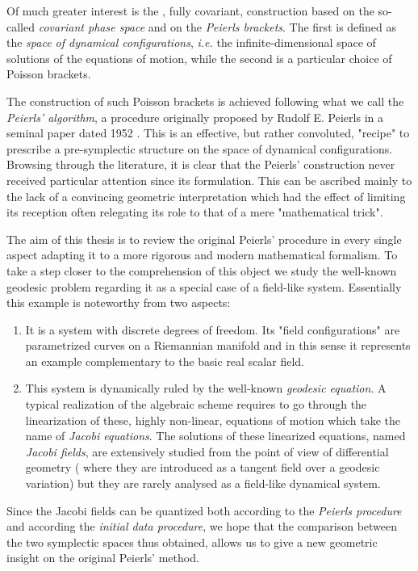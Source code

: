 \documentclass[Main]{subfiles}
\begin{document}
	
Of much greater interest is the , fully covariant, construction based on the so-called \emph{covariant phase space} and on the \emph{Peierls brackets}.
	The first is defined as the \emph{space of dynamical configurations}, \textit{i.e.}  the infinite-dimensional space of solutions of the equations of motion, while the second is a particular choice of Poisson brackets.%
	
	The construction of such Poisson brackets is achieved following what we call the \emph{Peierls' algorithm}, a procedure originally proposed by Rudolf E. Peierls in a seminal paper dated 1952 \cite{Peierls1952}. 
	This is an effective, but rather convoluted, "recipe"  to prescribe a pre-symplectic structure on the space of dynamical configurations. 
	Browsing through the literature, it is clear that the Peierls' construction never received particular attention since its formulation.
This can be ascribed mainly to the lack of a convincing geometric interpretation
which had the effect of limiting its reception often relegating its role to that of a mere  "mathematical trick".

The aim of this thesis is to review the original Peierls' procedure in every single aspect adapting it to a more rigorous and modern mathematical formalism.
To take a step closer to the comprehension of this object we study the well-known geodesic problem regarding it as a special case of a field-like system.
Essentially this example is noteworthy from two aspects:
\begin{enumerate}
	\item It is a system with discrete degrees of freedom. 
	Its "field configurations" are parametrized curves on a Riemannian manifold and in this sense it represents an example complementary to the basic real scalar field.
	\item This system is dynamically ruled by the well-known \emph{geodesic equation}.
		A typical realization of the algebraic scheme requires to go through the linearization of these, highly non-linear, equations of motion which take the name of \emph{Jacobi equations}.
		The solutions of these linearized equations, named  \emph{Jacobi fields}, are extensively studied from the point of view of differential geometry  ( where they are introduced as a tangent field over a geodesic variation) but they are rarely analysed as a field-like dynamical system.
\end{enumerate}
Since the Jacobi fields can be quantized both according to the \emph{Peierls procedure} and according the \emph{initial data procedure},
we hope that the comparison between the two symplectic spaces thus obtained, allows us to give a new geometric insight on the original Peierls' method.
\end{document}

